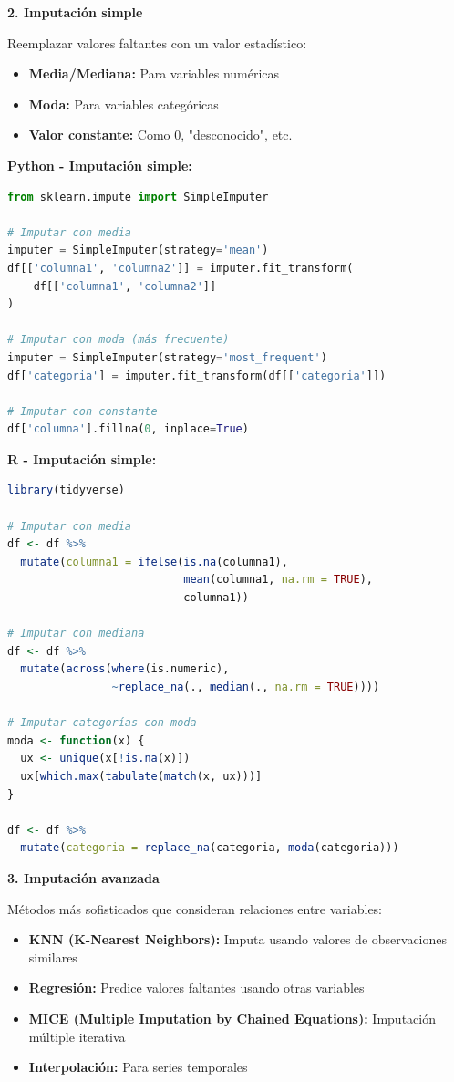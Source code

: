 \documentclass[a4paper,11pt]{article}
\begin{document}
\textbf{2. Imputación simple}

Reemplazar valores faltantes con un valor estadístico:

\begin{itemize}
    \item \textbf{Media/Mediana:} Para variables numéricas
    \item \textbf{Moda:} Para variables categóricas
    \item \textbf{Valor constante:} Como 0, "desconocido", etc.
\end{itemize}

\textbf{Python - Imputación simple:}
\begin{lstlisting}[language=Python]
from sklearn.impute import SimpleImputer

# Imputar con media
imputer = SimpleImputer(strategy='mean')
df[['columna1', 'columna2']] = imputer.fit_transform(
    df[['columna1', 'columna2']]
)

# Imputar con moda (más frecuente)
imputer = SimpleImputer(strategy='most_frequent')
df['categoria'] = imputer.fit_transform(df[['categoria']])

# Imputar con constante
df['columna'].fillna(0, inplace=True)
\end{lstlisting}

\textbf{R - Imputación simple:}
\begin{lstlisting}[language=R]
library(tidyverse)

# Imputar con media
df <- df %>%
  mutate(columna1 = ifelse(is.na(columna1), 
                           mean(columna1, na.rm = TRUE), 
                           columna1))

# Imputar con mediana
df <- df %>%
  mutate(across(where(is.numeric), 
                ~replace_na(., median(., na.rm = TRUE))))

# Imputar categorías con moda
moda <- function(x) {
  ux <- unique(x[!is.na(x)])
  ux[which.max(tabulate(match(x, ux)))]
}

df <- df %>%
  mutate(categoria = replace_na(categoria, moda(categoria)))
\end{lstlisting}

\textbf{3. Imputación avanzada}

Métodos más sofisticados que consideran relaciones entre variables:

\begin{itemize}
    \item \textbf{KNN (K-Nearest Neighbors):} Imputa usando valores de observaciones similares
    \item \textbf{Regresión:} Predice valores faltantes usando otras variables
    \item \textbf{MICE (Multiple Imputation by Chained Equations):} Imputación múltiple iterativa
    \item \textbf{Interpolación:} Para series temporales
\end{itemize}
\end{document}
